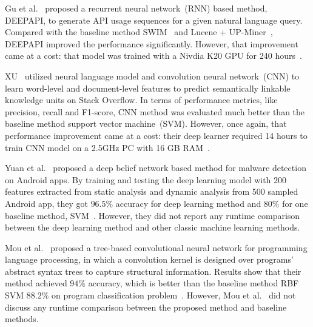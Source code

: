 \documentclass[sigconf]{acmart}
\theoremstyle{break}
\begin{document}
Gu et al.~\cite{gu2016deep} proposed  a recurrent neural network~(RNN)
 based method, D{\scriptsize EEP}API, to generate API usage sequences for a given natural language query. 
 Compared with the baseline method { SWIM}~\cite{raghothaman2016swim} and 
 { Lucene + UP-Miner}~\cite{wang2013mining},  D{\scriptsize EEP}API   improved the performance significantly.
 However, that improvement came at a cost: that  model was trained with a Nivdia K20 GPU for  240 hours~\cite{gu2016deep}.
 
 XU~\cite{xu2016predicting} utilized neural language model and  
 convolution neural network~(CNN) to  learn word-level and document-level features to
 predict semantically linkable knowledge units on Stack Overflow. 
 In terms of performance metrics, like precision, recall and F1-score,
 CNN method was evaluated much better than 
 the baseline method support vector machine~(SVM). 
 However, once again, that performance improvement came at a cost:
 their deep learner required  
 14 hours to train CNN model on a 2.5GHz PC with 16 GB RAM~\cite{xu2016predicting}.
 
 Yuan et al.~\cite{yuan2014droid} proposed a deep belief network based method for
 malware detection on Android apps. By training and testing
 the deep learning model with  200 features extracted
 from static analysis and dynamic analysis from 500 sampled Android app, they
 got $96.5\%$ accuracy for deep learning method  and $80\%$ for one baseline method, SVM~\cite{yuan2014droid}.
 However, they did not report any runtime comparison between the deep learning method and 
 other classic machine learning methods.
 
 Mou et al.~\cite{mou2016convolutional} proposed a  tree-based convolutional neural network
 for programming language processing, in
which a convolution kernel is designed over programs' abstract
syntax trees to capture structural information. Results show that their method achieved
$94\%$ accuracy, which is better than the baseline method RBF SVM $88.2\%$
on program classification problem~\cite{mou2016convolutional}. However, Mou
et al.~\cite{mou2016convolutional} did not discuss any runtime comparison between the proposed method and
baseline methods.



 
 
\end{document}
